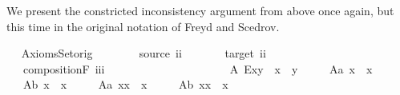 \begin{isabellebody}
\begin{isamarkuptext}
      We present the constricted inconsistency argument from above once again,
      but this time in the original notation of Freyd and Scedrov.%
\end{isamarkuptext}\isamarkuptrue%
\ \isamarkupfalse%
\ AxiomsSet{}orig\ {\isacharequal}\ \isanewline
\ \ \isanewline
\ \ \ source{\isacharcolon}{\isacharcolon}\ {\isachardoublequoteopen}i{\isasymRightarrow}i{\isachardoublequoteclose}\ {\isacharparenleft}{\isachardoublequoteopen}{\isasymbox}{\isacharunderscore}{\isachardoublequoteclose}\ {\isacharbrackleft}{}{}{}{\isacharbrackright}\ {}{}{}{\isacharparenright}\ \isanewline
\ \ \ target{\isacharcolon}{\isacharcolon}\ {\isachardoublequoteopen}i{\isasymRightarrow}i{\isachardoublequoteclose}\ {\isacharparenleft}{\isachardoublequoteopen}{\isacharunderscore}{\isasymbox}{\isachardoublequoteclose}\ {\isacharbrackleft}{}{}{}{\isacharbrackright}\ {}{}{}{\isacharparenright}\ \isanewline
\ \ \ compositionF{\isacharcolon}{\isacharcolon}\ {\isachardoublequoteopen}i{\isasymRightarrow}i{\isasymRightarrow}i{\isachardoublequoteclose}\ {\isacharparenleft}\ {\isachardoublequoteopen}\isactrlbold {\isasymcdot}{\isachardoublequoteclose}\ {}{}{}{\isacharparenright}\ \isanewline
\ \ \ \ \ \ \ \ \ \ \ \ \ \isanewline
\ \ \ \ A{}{\isacharcolon}\ {\isachardoublequoteopen}E{\isacharparenleft}x\isactrlbold {\isasymcdot}y{\isacharparenright}\ \isactrlbold {\isasymleftrightarrow}\ {\isacharparenleft}x{\isasymbox}\ {\isasymcong}\ {\isasymbox}y{\isacharparenright}{\isachardoublequoteclose}\ \ \isanewline
\ \ \ A{}a{\isacharcolon}\ {\isachardoublequoteopen}{\isacharparenleft}{\isacharparenleft}{\isasymbox}x{\isacharparenright}{\isasymbox}{\isacharparenright}\ {\isasymcong}\ {\isasymbox}x{\isachardoublequoteclose}\ \ \isanewline
\ \ \ A{}b{\isacharcolon}\ {\isachardoublequoteopen}{\isasymbox}{\isacharparenleft}x{\isasymbox}{\isacharparenright}\ {\isasymcong}\ {\isasymbox}x{\isachardoublequoteclose}\ \ \isanewline
\ \ \ A{}a{\isacharcolon}\ {\isachardoublequoteopen}{\isacharparenleft}{\isasymbox}x{\isacharparenright}\isactrlbold {\isasymcdot}x\ {\isasymcong}\ x{\isachardoublequoteclose}\ \ \isanewline
\ \ \ A{}b{\isacharcolon}\ {\isachardoublequoteopen}x\isactrlbold {\isasymcdot}{\isacharparenleft}x{\isasymbox}{\isacharparenright}\ {\isasymcong}\ x{\isachardoublequoteclose}\ \ \isanewline

\end{isabellebody}
